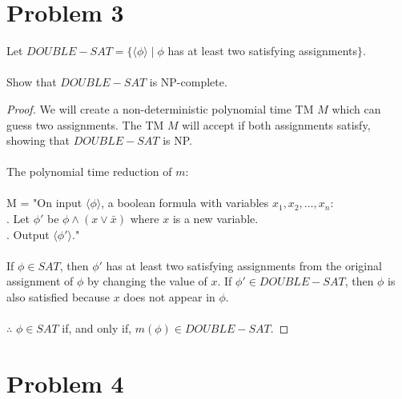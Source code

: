 \documentclass[11pt]{article}
\begin{document}
\section*{Problem 3}
Let $DOUBLE-SAT = \{ \langle \phi \rangle \mid \phi $ has at least two satisfying assignments$\}$.\\\\
Show that $DOUBLE-SAT$ is NP-complete.
\begin{proof}
We will create a non-deterministic polynomial time TM $M$ which can guess two assignments.
The TM $M$ will accept if both assignments satisfy, showing that $DOUBLE-SAT$ is NP.\\\\
The polynomial time reduction of $m$:\\\\
M = "On input $\langle \phi \rangle$, a boolean formula with variables $x_{1},x_{2},\ldots , x_{n}$:\\
. Let $\phi'$ be $\phi \land (x \lor \bar{x})$ where $x$ is a new variable.\\
. Output $\langle \phi' \rangle$."\\\\
If $\phi \in SAT$, then $\phi'$ has at least two satisfying assignments from the original assignment of $\phi$ by changing the value of $x$.
If $\phi' \in DOUBLE-SAT$, then $\phi$ is also satisfied because $x$ does not appear in $\phi$.\\\\
$\therefore$ $\phi \in SAT$ if, and only if, $m(\phi) \in DOUBLE-SAT$.


\end{proof}
\newpage
\section*{Problem 4}
\end{document}
